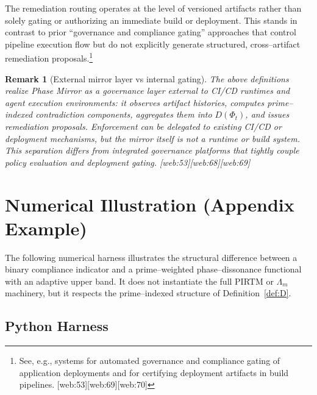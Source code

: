 \documentclass[11pt]{article}
\newtheorem{remark}[theorem]{Remark}
\begin{document}
The remediation routing operates at the level of versioned artifacts rather than solely gating or authorizing an immediate build or deployment. This stands in contrast to prior ``governance and compliance gating'' approaches that control pipeline execution flow but do not explicitly generate structured, cross--artifact remediation proposals.\footnote{See, e.g., systems for automated governance and compliance gating of application deployments and for certifying deployment artifacts in build pipelines. [web:53][web:69][web:70]}

\begin{remark}[External mirror layer vs internal gating]
The above definitions realize Phase Mirror as a governance layer external to CI/CD runtimes and agent execution environments: it observes artifact histories, computes prime--indexed contradiction components, aggregates them into $D(\Phi_t)$, and issues remediation proposals. Enforcement can be delegated to existing CI/CD or deployment mechanisms, but the mirror itself is not a runtime or build system. This separation differs from integrated governance platforms that tightly couple policy evaluation and deployment gating. [web:53][web:68][web:69]
\end{remark}
\newpage
\section{Numerical Illustration (Appendix Example)}

The following numerical harness illustrates the structural difference between a binary compliance indicator and a prime--weighted phase--dissonance functional with an adaptive upper band. It does not instantiate the full PIRTM or $\Lambda_m$ machinery, but it respects the prime--indexed structure of Definition~\ref{def:D}.

\subsection*{Python Harness}
\end{document}

